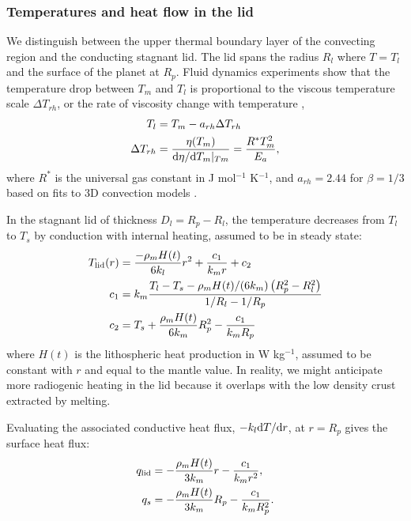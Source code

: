 \subsubsection{Temperatures and heat flow in the lid}

We distinguish between the upper thermal boundary layer of the convecting region and the conducting stagnant lid. The lid spans the radius $R_l$ where $T = T_l$ and the surface of the planet at $R_p$. Fluid dynamics experiments show that the temperature drop between $T_m$ and $T_l$ is proportional to the viscous temperature scale $\Delta T_{rh}$, or the rate of viscosity change with temperature \citep{Davaille1993},
\begin{align}
\label{eq:Tl}
T_{l} &= T_m - a_{rh} \Delta T_{rh} \\
\Delta T_{rh} &= \frac{\eta(T_m)}{{\rm d}\eta/{\rm d}T_m\vert_{Tm}} = \frac{R^* T_m^2}{E_a},
\end{align}
where $R^*$ is the universal gas constant in J mol$^{-1}$ K$^{-1}$, and $a_{rh} = 2.44$ for $\beta = 1/3$ based on fits to 3D convection models \citep{Thiriet2019}. 



In the stagnant lid of thickness $D_l = R_p - R_l$, the temperature decreases from $T_l$ to $T_s$ by conduction with internal heating, assumed to be in steady state:
\begin{align}
T_{\rm lid}(r) &= \frac{-\rho_m H(t)}{6k_l} r^2 + \frac{c_1}{k_m r} + c_2 \\
    c_1 &= k_m \frac{T_l - T_s - \rho_m H(t)/(6 k_m) \left(R_p^2 - R_l^2\right)}{1/R_l - 1/R_p} \\
    c_2 &= T_s + \frac{\rho_m H(t)}{6 k_m} R_p^2 - \frac{c_1}{k_m R_p}
\end{align} 
where $H(t)$ is the lithospheric heat production in W kg$^{-1}$, assumed to be constant with $r$ and equal to the mantle value. In reality, we might anticipate more radiogenic heating in the lid because it overlaps with the low density crust extracted by melting.

Evaluating the associated conductive heat flux, $-k_l \mathrm{d} T/\mathrm{d} r$, at $r = R_p$ gives the surface heat flux:
\begin{align}
q_{\rm lid} &= -\frac{\rho_m H(t)}{3k_m}r - \frac{c_1}{k_m r^2},\\
q_{s} &= -\frac{\rho_m H(t)}{3k_m}R_p - \frac{c_1}{k_m R_p^2}. \label{eq:q_s}
\end{align}



